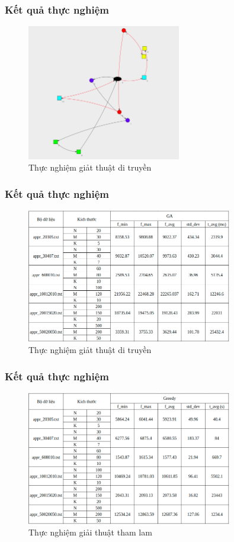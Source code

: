 \documentclass{beamer}
\begin{document}
	\begin{frame}
		\frametitle{Kết quả thực nghiệm}
		\begin{figure}
			\centering
			\caption{Thực nghiệm giảt thuật di truyền}
			\includegraphics[width=0.6\textwidth]{../result/image/solution.png}
		\end{figure}
	\end{frame}

	\begin{frame}
		\frametitle{Kết quả thực nghiệm}
		\begin{figure}
			\centering
			\caption{Thực nghiệm giảt thuật di truyền}
			\includegraphics[width=0.8\textwidth]{images/ga.png}
		\end{figure}
	\end{frame}

	\begin{frame}
		\frametitle{Kết quả thực nghiệm}
		\begin{figure}
			\centering
			\caption{Thực nghiệm giải thuật tham lam}
			\includegraphics[width=0.8\textwidth]{images/greedy.png}
		\end{figure}
	\end{frame}
\end{document}
